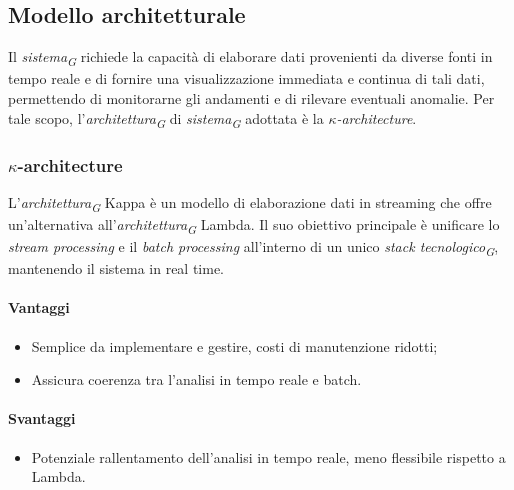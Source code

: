 \subsection{Modello architetturale}
Il \textit{sistema}\textsubscript{\textit{G}} richiede la capacità di elaborare dati provenienti da diverse fonti in tempo reale e di fornire una visualizzazione immediata e continua di tali dati, permettendo di monitorarne gli andamenti e di rilevare eventuali anomalie. 
Per tale scopo, l'\textit{architettura}\textsubscript{\textit{G}} di \textit{sistema}\textsubscript{\textit{G}} adottata è la \textit{$\kappa$-architecture}.

\subsubsection{$\kappa$-architecture}
L'\textit{architettura}\textsubscript{\textit{G}} Kappa è un modello di elaborazione dati in streaming che offre un'alternativa all'\textit{architettura}\textsubscript{\textit{G}} Lambda. Il suo obiettivo principale è unificare lo \textit{stream processing} e il \textit{batch processing} all'interno di un unico \textit{stack tecnologico}\textsubscript{\textit{G}}, mantenendo il sistema in real time.

\paragraph{Vantaggi}
\begin{itemize}
    \item Semplice da implementare e gestire, costi di manutenzione ridotti;
    \item Assicura coerenza tra l'analisi in tempo reale e batch.
\end{itemize}

\paragraph{Svantaggi}
\begin{itemize}
    \item Potenziale rallentamento dell'analisi in tempo reale, meno flessibile rispetto a Lambda.
\end{itemize}

